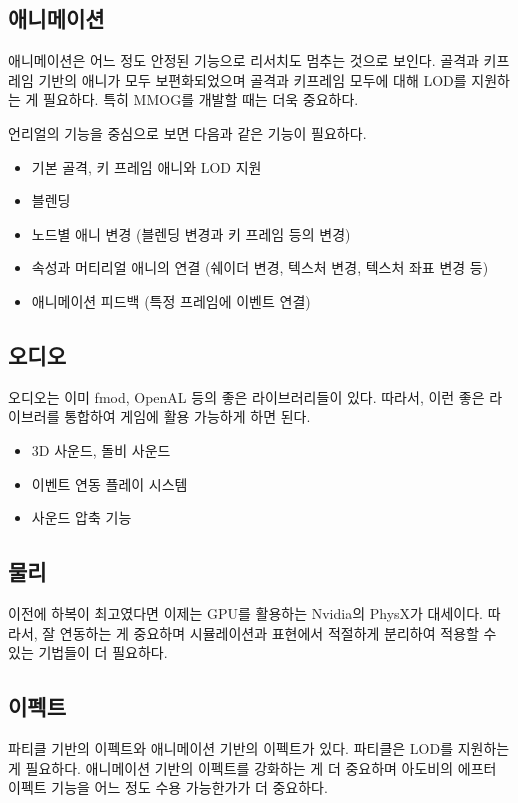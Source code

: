 \documentclass[chapter,kosection, 10.5pt, romanfixed, a4paper]{oblivoir}
\begin{document}
\subsection{애니메이션}

애니메이션은 어느 정도 안정된 기능으로 리서치도 멈추는 것으로 보인다. 
골격과 키프레임 기반의 애니가 모두 보편화되었으며 골격과 키프레임 모두에 대해 
LOD를 지원하는 게 필요하다. 특히 MMOG를 개발할 때는 더욱 중요하다. 

언리얼의 기능을 중심으로 보면 다음과 같은 기능이 필요하다. 
\begin{itemize}
\item 기본 골격, 키 프레임 애니와 LOD 지원
\item 블렌딩 
\item 노드별 애니 변경 (블렌딩 변경과 키 프레임 등의 변경)
\item 속성과 머티리얼 애니의 연결 (쉐이더 변경, 텍스처 변경, 텍스처 좌표 변경 등)
\item 애니메이션 피드백 (특정 프레임에 이벤트 연결)
\end{itemize}

\subsection{오디오}

오디오는 이미 fmod, OpenAL 등의 좋은 라이브러리들이 있다. 따라서, 이런 좋은
라이브러를 통합하여 게임에 활용 가능하게 하면 된다. 

\begin{itemize}
\item 3D 사운드, 돌비 사운드
\item 이벤트 연동 플레이 시스템 
\item 사운드 압축 기능 
\end{itemize}

\subsection{물리}

이전에 하복이 최고였다면 이제는 GPU를 활용하는  Nvidia의 PhysX가 대세이다. 
따라서, 잘 연동하는 게 중요하며 시뮬레이션과 표현에서 적절하게 분리하여 
적용할 수 있는 기법들이 더 필요하다. 

\subsection{이펙트}

파티클 기반의 이펙트와 애니메이션 기반의 이펙트가 있다. 파티클은 LOD를 
지원하는 게 필요하다. 애니메이션 기반의 이펙트를 강화하는 게 더 중요하며 
아도비의 에프터 이펙트 기능을 어느 정도 수용 가능한가가 더 중요하다. 
\end{document}
